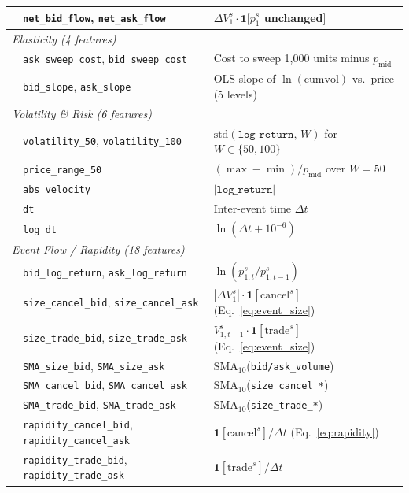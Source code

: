 \documentclass[11pt]{report}
\begin{document}
\begin{table}[H]
\begin{tabular}{p{} p{} p{}}
& \texttt{net\_bid\_flow}, \texttt{net\_ask\_flow} & $\Delta V^s_1 \cdot \mathbf{1}[p^s_1$ unchanged$]$ \\
\midrule
\multicolumn{3}{l}{\textit{Elasticity (4 features)}} \\
\addlinespace
& \texttt{ask\_sweep\_cost}, \texttt{bid\_sweep\_cost} & Cost to sweep 1{,}000 units minus $p_{\text{mid}}$ \\
& \texttt{bid\_slope}, \texttt{ask\_slope} & OLS slope of $\ln(\text{cumvol})$ vs.\ price (5 levels) \\
\midrule
\multicolumn{3}{l}{\textit{Volatility \& Risk (6 features)}} \\
\addlinespace
& \texttt{volatility\_50}, \texttt{volatility\_100} & $\text{std}(\texttt{log\_return},\, W)$ for $W \in \{50, 100\}$ \\
& \texttt{price\_range\_50} & $(\max - \min)/p_{\text{mid}}$ over $W{=}50$ \\
& \texttt{abs\_velocity} & $|\texttt{log\_return}|$ \\
& \texttt{dt} & Inter-event time $\Delta t$ \\
& \texttt{log\_dt} & $\ln(\Delta t + 10^{-6})$ \\
\midrule
\multicolumn{3}{l}{\textit{Event Flow / Rapidity (18 features)}} \\
\addlinespace
& \texttt{bid\_log\_return}, \texttt{ask\_log\_return} & $\ln(p^s_{1,t}/p^s_{1,t-1})$ \\
& \texttt{size\_cancel\_bid}, \texttt{size\_cancel\_ask} & $|\Delta V^s_1| \cdot \mathbf{1}[\text{cancel}^s]$ (Eq.~\ref{eq:event_size})~\cite{poutre_2024} \\
& \texttt{size\_trade\_bid}, \texttt{size\_trade\_ask} & $V^s_{1,t-1} \cdot \mathbf{1}[\text{trade}^s]$ (Eq.~\ref{eq:event_size})~\cite{poutre_2024} \\
& \texttt{SMA\_size\_bid}, \texttt{SMA\_size\_ask} & SMA$_{10}$(\texttt{bid/ask\_volume})~\cite{poutre_2024} \\
& \texttt{SMA\_cancel\_bid}, \texttt{SMA\_cancel\_ask} & SMA$_{10}$(\texttt{size\_cancel\_*})~\cite{poutre_2024} \\
& \texttt{SMA\_trade\_bid}, \texttt{SMA\_trade\_ask} & SMA$_{10}$(\texttt{size\_trade\_*})~\cite{poutre_2024} \\
& \texttt{rapidity\_cancel\_bid}, \texttt{rapidity\_cancel\_ask} & $\mathbf{1}[\text{cancel}^s]/\Delta t$ (Eq.~\ref{eq:rapidity})~\cite{poutre_2024} \\
& \texttt{rapidity\_trade\_bid}, \texttt{rapidity\_trade\_ask} & $\mathbf{1}[\text{trade}^s]/\Delta t$~\cite{poutre_2024} \\

\end{tabular}
\end{table}
\end{document}
